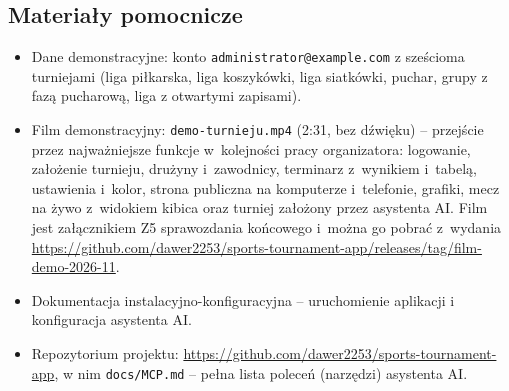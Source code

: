 \documentclass[11pt,a4paper,oneside]{article}
\newif\ifpodpowiedzi
\newcommand{\podpowiedz}[1]{\ifpodpowiedzi\par\begingroup\small\color{hintcolor}\textit{Wskazówka: #1}\par\endgroup\fi}
\begin{document}
\subsection{Materiały pomocnicze}
\podpowiedz{Wskaż przydatne instrukcje, przykładowe pliki oraz obowiązkowe nagranie pokazujące działanie lub rezultat oddanej wersji projektu. Podaj nazwy i lokalizację materiałów. Źródła zewnętrzne przywołane w instrukcji opisz tytułem, adresem i datą dostępu. Jeśli materiały zostały już wymienione w sprawozdaniu końcowym, możesz odwołać się do odpowiedniej sekcji. Podsekcję można usunąć, jeśli nie wnosi dodatkowych informacji; nie znosi to obowiązku przekazania nagrania i wskazania go w wykazie załączników sprawozdania końcowego.}
\begin{itemize}
\item Dane demonstracyjne: konto \texttt{administrator@example.com} z sześcioma turniejami (liga piłkarska, liga koszykówki, liga siatkówki, puchar, grupy z fazą pucharową, liga z otwartymi zapisami).
\item Film demonstracyjny: \texttt{demo-turnieju.mp4} (2:31, bez dźwięku) -- przejście przez najważniejsze funkcje w~kolejności pracy organizatora: logowanie, założenie turnieju, drużyny i~zawodnicy, terminarz z~wynikiem i~tabelą, ustawienia i~kolor, strona publiczna na komputerze i~telefonie, grafiki, mecz na żywo z~widokiem kibica oraz turniej założony przez asystenta AI. Film jest załącznikiem Z5 sprawozdania końcowego i~można go pobrać z~wydania \url{https://github.com/dawer2253/sports-tournament-app/releases/tag/film-demo-2026-11}.
\item Dokumentacja instalacyjno-konfiguracyjna -- uruchomienie aplikacji i konfiguracja asystenta AI.
\item Repozytorium projektu: \url{https://github.com/dawer2253/sports-tournament-app}, w nim \texttt{docs/MCP.md} -- pełna lista poleceń (narzędzi) asystenta AI.
\end{itemize}
\end{document}
